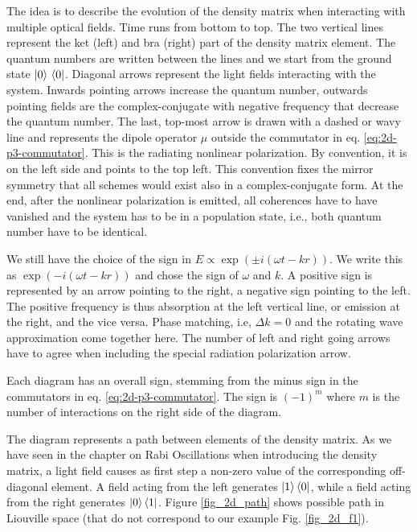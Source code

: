 The idea is to describe the evolution of the density matrix when interacting with multiple optical fields.
Time runs from bottom to top. The two vertical lines represent the ket (left) and bra (right) part of the density matrix element. The quantum numbers are written between the lines and we start from the ground state $\ket{0}\, \bra{0}$. Diagonal arrows represent the light fields interacting with the system. Inwards pointing arrows increase the quantum number, outwards pointing fields are the complex-conjugate with negative frequency that decrease the quantum number. The last, top-most arrow is drawn with a dashed or wavy line and represents the dipole operator $\mu$ outside the commutator in eq. \ref{eq:2d-p3-commutator}. This is the radiating nonlinear polarization. By convention, it is on the left side and points to the top left. This convention fixes the mirror symmetry that all schemes would exist also in a complex-conjugate form. At the end, after the nonlinear polarization is emitted, all coherences have to have vanished and the system has to be in a population state, i.e., both quantum number have to be identical.



We still have the choice of the sign in $E \propto \exp( \pm i (\omega t - k r) )$. We write this as  $\exp(- i (\omega t - k r) )$ and chose the sign of $\omega$ and $k$.
A positive sign is represented by an arrow pointing to the right, a negative sign pointing to the left. The positive frequency is thus absorption at the left vertical line, or emission at the right, and the vice versa. Phase matching, i.e, $\Delta k = 0$ and the rotating wave approximation come together here. The number of left and right going arrows have to agree when including the special radiation polarization arrow.

Each diagram has an overall sign, stemming from the minus sign in the commutators in eq. \ref{eq:2d-p3-commutator}. The sign is $(-1)^m$ where $m$ is the number of interactions on the right side of the diagram.

The diagram represents a path between elements of the density matrix. As we have seen in the chapter on Rabi Oscillations when introducing the density matrix, a light field causes as first step a non-zero value of the corresponding off-diagonal element. A field acting from the left generates $\ket{1} \bra{0}$, while a field acting from the right generates $\ket{0} \bra{1}$. Figure \ref{fig_2d_path} shows possible path in Liouville space (that do not correspond to our example Fig. \ref{fig_2d_f1}).

